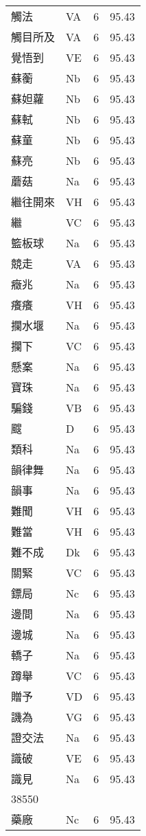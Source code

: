\documentclass[twocolumn]{book}
\begin{document}
\begin{supertabular}{llrr}
觸法 & VA & 6 &  95.43\\
觸目所及 & VA & 6 &  95.43\\
覺悟到 & VE & 6 &  95.43\\
蘇蘅 & Nb & 6 &  95.43\\
蘇妲蘿 & Nb & 6 &  95.43\\
蘇軾 & Nb & 6 &  95.43\\
蘇童 & Nb & 6 &  95.43\\
蘇亮 & Nb & 6 &  95.43\\
蘑菇 & Na & 6 &  95.43\\
繼往開來 & VH & 6 &  95.43\\
繼 & VC & 6 &  95.43\\
籃板球 & Na & 6 &  95.43\\
競走 & VA & 6 &  95.43\\
癥兆 & Na & 6 &  95.43\\
癢癢 & VH & 6 &  95.43\\
攔水堰 & Na & 6 &  95.43\\
攔下 & VC & 6 &  95.43\\
懸案 & Na & 6 &  95.43\\
寶珠 & Na & 6 &  95.43\\
騙錢 & VB & 6 &  95.43\\
颼 & D & 6 &  95.43\\
類科 & Na & 6 &  95.43\\
韻律舞 & Na & 6 &  95.43\\
韻事 & Na & 6 &  95.43\\
難聞 & VH & 6 &  95.43\\
難當 & VH & 6 &  95.43\\
難不成 & Dk & 6 &  95.43\\
關緊 & VC & 6 &  95.43\\
鏢局 & Nc & 6 &  95.43\\
邊間 & Na & 6 &  95.43\\
邊城 & Na & 6 &  95.43\\
轎子 & Na & 6 &  95.43\\
蹲舉 & VC & 6 &  95.43\\
贈予 & VD & 6 &  95.43\\
譏為 & VG & 6 &  95.43\\
證交法 & Na & 6 &  95.43\\
識破 & VE & 6 &  95.43\\
識見 & Na & 6 &  95.43\\
38550\\
藥廠 & Nc & 6 &  95.43\\

\end{supertabular}
\end{document}
